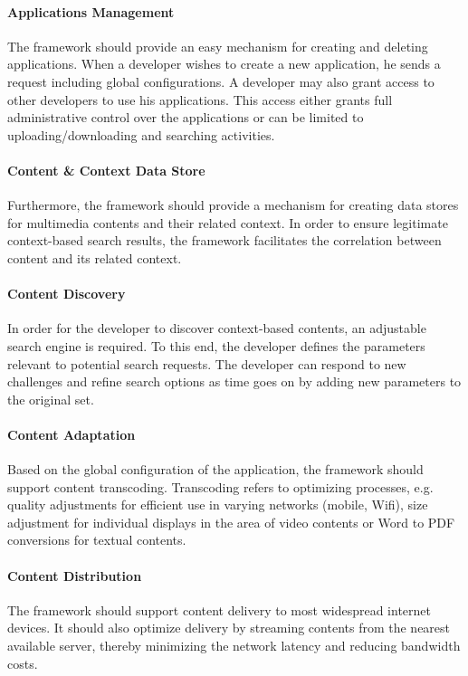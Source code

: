 \paragraph{Applications Management}
The framework should provide an easy mechanism for creating and deleting applications. When a developer wishes to create a new application, he sends a request including global configurations. A developer may also grant access to other developers to use his applications. This access either grants full administrative control over the applications or can be limited to uploading/downloading and searching activities. 

\paragraph{Content \& Context Data Store}
Furthermore, the framework should provide a mechanism for creating data stores for multimedia contents and their related context. In order to ensure legitimate context-based search results, the framework facilitates the correlation between content and its related context. 

\paragraph{Content Discovery}
In order for the developer to discover context-based contents, an adjustable search engine is required. To this end, the developer defines the parameters relevant to potential search requests. The developer can respond to new challenges and refine search options as time goes on by adding new parameters to the original set.      

\paragraph{Content Adaptation}
Based on the global configuration of the application, the framework should support content transcoding. Transcoding refers to optimizing processes, e.g. quality adjustments for efficient use in varying networks (mobile, Wifi), size adjustment for individual displays in the area of video contents or Word to PDF conversions for textual contents.
  
\paragraph{Content Distribution}
The framework should support content delivery to most widespread internet devices. It should also optimize delivery by streaming contents from the nearest available server, thereby minimizing the network latency and reducing bandwidth costs.   

